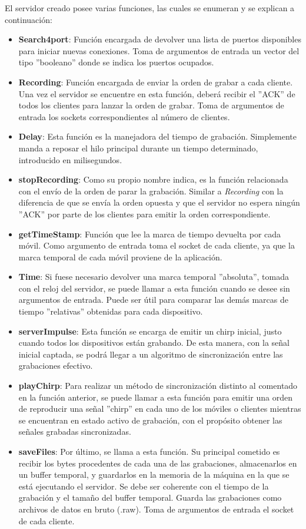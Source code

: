 \documentclass[a4paper,11pt]{book}
\begin{document}
				 El servidor creado posee varias funciones, las cuales se enumeran y se explican a continuación:	 	 
				\begin{itemize}
				\item \textbf{Search4port}: Función encargada de devolver una lista de puertos disponibles para iniciar nuevas conexiones. Toma de argumentos de entrada un vector del tipo ''booleano'' donde se indica los puertos ocupados.
				\item \textbf{Recording}: Función encargada de enviar la orden de grabar a cada cliente. Una vez el servidor se encuentre en esta función, deberá recibir el ''ACK'' de todos los clientes para lanzar la orden de grabar. Toma de argumentos de entrada los sockets correspondientes al número de clientes.
				\item \textbf{Delay}: Esta función es la manejadora del tiempo de grabación. Simplemente manda a reposar el hilo principal durante un tiempo determinado, introducido en milisegundos.
				\item \textbf{stopRecording}: Como su propio nombre indica, es la función relacionada con el envío de la orden de parar la grabación. Similar a \textit{Recording} con la diferencia de que se envía la orden opuesta y que el servidor no espera ningún ''ACK'' por parte de los clientes para emitir la orden correspondiente.
				\item \textbf{getTimeStamp}: Función que lee la marca de tiempo devuelta por cada móvil. Como argumento de entrada toma el socket de cada cliente, ya que la marca temporal de cada móvil proviene de la aplicación.
				\item \textbf{Time}: Si fuese necesario devolver una marca temporal ''absoluta'', tomada con el reloj del servidor, se puede llamar a esta función cuando se desee sin argumentos de entrada. Puede ser útil para comparar las demás marcas de tiempo ''relativas'' obtenidas para cada dispositivo.
				\item \textbf{serverImpulse}: Esta función se encarga de emitir un chirp inicial, justo cuando todos los dispositivos están grabando. De esta manera, con la señal inicial captada, se podrá llegar a un algoritmo de sincronización entre las grabaciones efectivo.
				\item \textbf{playChirp}: Para realizar un método de sincronización distinto al comentado en la función anterior, se puede llamar a esta función para emitir una orden de reproducir una señal ''chirp'' en cada uno de los móviles o clientes mientras se encuentran en estado activo de grabación, con el propósito obtener las señales grabadas sincronizadas.
				\item \textbf{saveFiles}: Por último, se llama a esta función. Su principal cometido es recibir los bytes procedentes de cada una de las grabaciones, almacenarlos en un buffer temporal, y guardarlos en la memoria de la máquina en la que se está ejecutando el servidor. Se debe ser coherente con el tiempo de la grabación y el tamaño del buffer temporal. Guarda las grabaciones como archivos de datos en bruto (.raw). Toma de argumentos de entrada el socket de cada cliente.
				\end{itemize}
\end{document}
